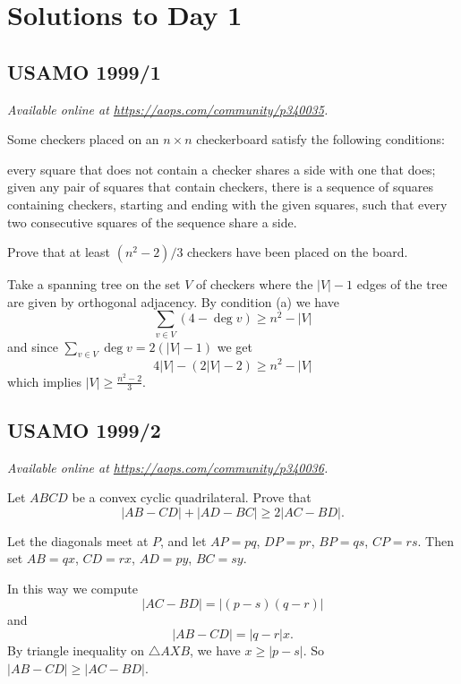 \documentclass[11pt]{scrartcl}
\begin{document}
\section{Solutions to Day 1}
\subsection{USAMO 1999/1}
\textsl{Available online at \url{https://aops.com/community/p340035}.}
\begin{mdframed}[style=mdpurplebox,frametitle={Problem statement}]
Some checkers placed on an $n \times n$ checkerboard satisfy the following conditions:
\begin{enumerate}
  \ii[(a)] every square that does not contain a checker shares a side with one that does;
  \ii[(b)] given any pair of squares that contain checkers,
  there is a sequence of squares containing checkers,
  starting and ending with the given squares,
  such that every two consecutive squares of the sequence share a side.
\end{enumerate}
Prove that at least $(n^{2}-2)/3$ checkers have been placed on the board.
\end{mdframed}
Take a spanning tree on the set $V$ of checkers
where the $|V|-1$ edges of the tree are given by orthogonal adjacency.
By condition (a) we have
\[ \sum_{v \in V} (4-\deg v) \ge n^2 - |V| \]
and since $\sum_{v \in V} \deg v = 2(|V|-1)$
we get
\[ 4|V| - \left( 2|V|-2 \right) \ge n^2 - |V| \]
which implies $|V| \ge \frac{n^2-2}{3}$.
\pagebreak

\subsection{USAMO 1999/2}
\textsl{Available online at \url{https://aops.com/community/p340036}.}
\begin{mdframed}[style=mdpurplebox,frametitle={Problem statement}]
Let $ABCD$ be a convex cyclic quadrilateral.
Prove that \[ |AB - CD| + |AD - BC| \geq 2|AC - BD|. \]
\end{mdframed}
Let the diagonals meet at $P$,
and let $AP = pq$, $DP = pr$, $BP = qs$, $CP = rs$.
Then set $AB = qx$, $CD = rx$, $AD = py$, $BC = sy$.


In this way we compute
\[ \left\lvert AC-BD \right\rvert
  = \left\lvert (p-s)(q-r) \right\rvert  \]
and
\[ \left\lvert AB-CD \right\rvert
  = \left\lvert q-r \right\rvert x. \]
By triangle inequality on $\triangle AXB$,
we have $x \ge \left\lvert p-s \right\rvert$.
So $\left\lvert AB-CD \right\rvert \ge \left\lvert AC-BD \right\rvert$.
\pagebreak
\end{document}
